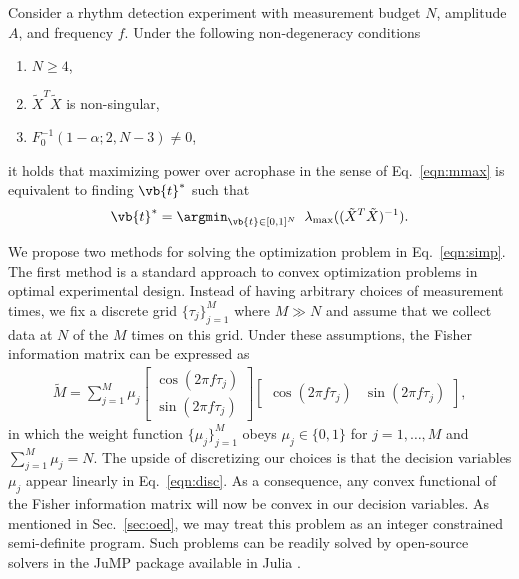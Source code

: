 \begin{theorem}\label{thm:equiv}
Consider a rhythm detection experiment with measurement budget $N$, amplitude $A$, and frequency $f$. Under the following non-degeneracy conditions
\begin{enumerate}
    \item $N\geq 4$,
    \item $\tilde{X}^T \tilde{X}$ is non-singular,
    \item $F_0^{-1}(1-\alpha;2,N-3) \neq 0$, 
\end{enumerate}
it holds that maximizing power over acrophase in the sense of Eq.~\eqref{eqn:mmax} is equivalent to finding $\vb{t}^*$ such that
\begin{align}
    \vb{t}^* = \argmin_{\vb{t} \in [0,1]^N} \;\; \lambda_{\mathrm{max}} ((\tilde{X}^T \tilde{X})^{-1}).\label{eqn:simp}
\end{align}
\end{theorem}

We propose two methods for solving the optimization problem in Eq.~\eqref{eqn:simp}. The first method is a standard approach to convex optimization problems in optimal experimental design. Instead of having arbitrary choices of measurement times, we fix a discrete grid $\{\tau_{j}\}_{j=1}^{M}$ where $M\gg N$ and assume that we collect data at $N$ of the $M$ times on this grid. Under these assumptions, the Fisher information matrix can be expressed as
\begin{align}
 \tilde{M} = \sum_{j=1}^{M}  \mu_j \begin{bmatrix}
        \cos(2\pi f \tau_j)\\ 
        \sin(2\pi f \tau_j)
    \end{bmatrix}
    \begin{bmatrix} \cos(2\pi f \tau_j) & \sin(2\pi f \tau_j) \end{bmatrix},\label{eqn:disc}
\end{align}
in which the weight function $\{\mu_{j}\}_{j=1}^{M}$ obeys $\mu_{j}\in \{0,1\}$ for $j=1,\ldots, M$ and $ \sum_{j=1}^{M} \mu_{j} = N$. 
The upside of discretizing our choices is that the decision variables $\mu_{j}$ appear linearly in Eq.~\eqref{eqn:disc}. As a consequence, any convex functional of the Fisher information matrix will now be convex in our decision variables. As mentioned in Sec.~\ref{sec:oed}, we may treat this problem as an integer constrained semi-definite program. Such problems can be readily solved by open-source solvers in the JuMP package available in Julia \cite{Lubin2023}.

